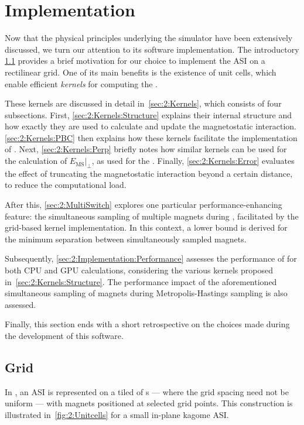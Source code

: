 \newpage
\section{Implementation}\label{sec:2:Implementation}
Now that the physical principles underlying the simulator have been extensively discussed, we turn our attention to its software implementation.
The introductory \cref{sec:2:Implementation:Grid} provides a brief motivation for our choice to implement the ASI on a rectilinear grid.
One of its main benefits is the existence of unit cells, which enable efficient \textit{kernels} for computing the . \par
These kernels are discussed in detail in~\cref{sec:2:Kernels}, which consists of four subsections.
First, \cref{sec:2:Kernels:Structure} explains their internal structure and how exactly they are used to calculate and update the magnetostatic interaction.
\cref{sec:2:Kernels:PBC} then explains how these kernels facilitate the implementation of .
Next, \cref{sec:2:Kernels:Perp} briefly notes how similar kernels can be used for the calculation of $\left. E_{\mathrm{MS}} \right|_{\perp}$, as used for the .
Finally, \cref{sec:2:Kernels:Error} evaluates the effect of truncating the magnetostatic interaction beyond a certain distance, to reduce the computational load. \par
After this, \cref{sec:2:MultiSwitch} explores one particular performance-enhancing feature: the simultaneous sampling of multiple magnets during , facilitated by the grid-based kernel implementation.
In this context, a lower bound is derived for the minimum separation between simultaneously sampled magnets. \par
Subsequently, \cref{sec:2:Implementation:Performance} assesses the performance of \hotspice for both CPU and GPU calculations, considering the various kernels proposed in~\cref{sec:2:Kernels:Structure}.
The performance impact of the aforementioned simultaneous sampling of magnets during Metropolis-Hastings sampling is also assessed. \par
Finally, this section ends with a short retrospective on the choices made during the development of this software.

\subsection{Grid}\label{sec:2:Implementation:Grid}
In \hotspice, an ASI is represented on a tiled  of s --- where the grid spacing need not be uniform --- with magnets positioned at selected grid points.
This construction is illustrated in~\cref{fig:2:Unitcells} for a small in-plane kagome ASI.

